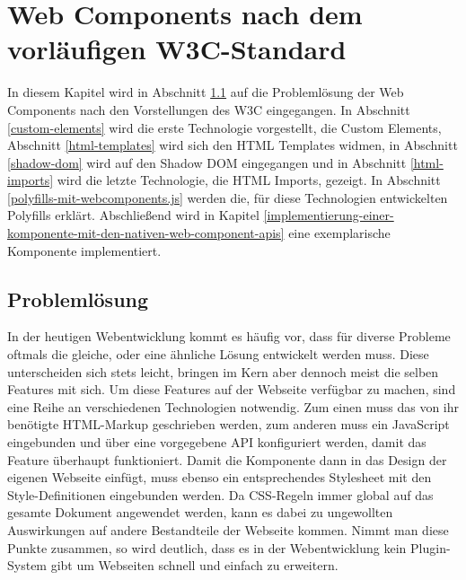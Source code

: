 \chapter{Web Components nach dem vorläufigen W3C-Standard}\label{web-components-nach-w3c}

In diesem Kapitel wird in Abschnitt \ref{problemloesung} auf die Problemlösung der Web Components nach den Vorstellungen des \ac{W3C} eingegangen. In Abschnitt \ref{custom-elements} wird die erste Technologie vorgestellt, die Custom Elements, Abschnitt \ref{html-templates} wird sich den \ac{HTML} Templates widmen, in Abschnitt \ref{shadow-dom} wird auf den Shadow \ac{DOM} eingegangen und in Abschnitt \ref{html-imports} wird die letzte Technologie, die \ac{HTML} Imports, gezeigt. In Abschnitt \ref{polyfills-mit-webcomponents.js} werden die, für diese Technologien entwickelten Polyfills erklärt. Abschließend wird in Kapitel \ref{implementierung-einer-komponente-mit-den-nativen-web-component-apis} eine exemplarische Komponente implementiert.


\section{Problemlösung}\label{problemloesung}

In der heutigen Webentwicklung kommt es häufig vor, dass für diverse Probleme oftmals die gleiche, oder eine ähnliche Lösung entwickelt werden muss. Diese unterscheiden sich stets leicht, bringen im Kern aber dennoch meist die selben Features mit sich. Um diese Features auf der Webseite verfügbar zu machen, sind eine Reihe an verschiedenen Technologien notwendig. Zum einen muss das von ihr benötigte \ac{HTML}-Markup geschrieben werden, zum anderen muss ein JavaScript eingebunden und über eine vorgegebene \ac{API} konfiguriert werden, damit das Feature überhaupt funktioniert. Damit die Komponente dann in das Design der eigenen Webseite einfügt, muss ebenso ein entsprechendes Stylesheet mit den Style-Definitionen eingebunden werden. Da \ac{CSS}-Regeln immer global auf das gesamte Dokument angewendet werden, kann es dabei zu ungewollten Auswirkungen auf andere Bestandteile der Webseite kommen. Nimmt man diese Punkte zusammen, so wird deutlich, dass es in der Webentwicklung kein Plugin-System gibt um Webseiten schnell und einfach zu erweitern.

